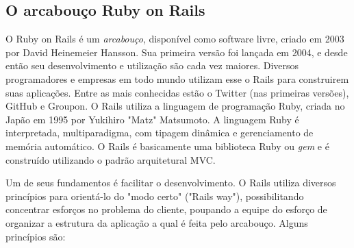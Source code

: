 \subsection{O arcabouço Ruby on Rails}

O Ruby on Rails é um \textit{arcabouço}, disponível como software livre, criado em 2003 por David Heinemeier Hansson.
%
Sua primeira versão foi lançada em 2004, e desde então seu desenvolvimento e utilização são cada vez maiores.
%
Diversos programadores e empresas em todo mundo utilizam esse o Rails para construirem suas aplicações. Entre as mais conhecidas estão o Twitter (nas primeiras versões), GitHub e Groupon. 
%
O Rails utiliza a linguagem de programação Ruby, criada no Japão em 1995 por Yukihiro "Matz" Matsumoto. A linguagem Ruby é interpretada, multiparadigma, com tipagem dinâmica e gerenciamento de memória automático. O Rails é basicamente uma biblioteca Ruby ou \textit{gem} e é construído utilizando o padrão arquitetural MVC.

Um de seus fundamentos é facilitar o desenvolvimento. O Rails utiliza diversos princípios para orientá-lo do "modo certo" ("Rails way"), possibilitando concentrar esforços no problema do cliente, poupando a equipe do esforço de organizar a estrutura da aplicação a qual é feita pelo arcabouço. Alguns princípios são:


